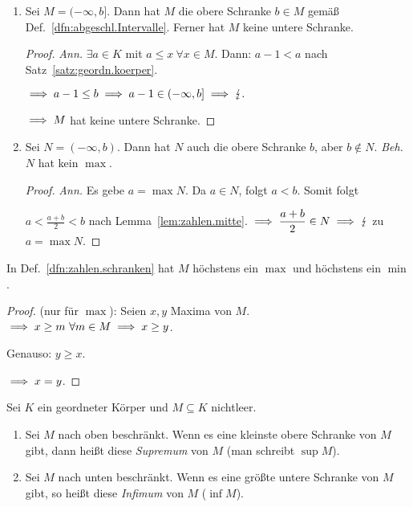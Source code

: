 \documentclass[12pt]{scrreprt}
\begin{document}
\begin{bsp}
\begin{enumerate} %
\item Sei $M=(-\infty,b]$. Dann hat $M$ die obere Schranke $b\in M$ gemäß Def.~\ref{dfn:abgeschl.Intervalle}. Ferner hat $M$ keine untere Schranke.
\begin{proof}\textit{Ann.} $\exists a\in K$ mit $a \leq x\ \forall x\in M$. Dann: $a-1<a$ nach Satz~\ref{satz:geordn.koerper}.

$\implies a-1\leq b \implies a-1\in (-\infty,b] \implies \lightning.$

$\implies M$ hat keine untere Schranke.\end{proof}

\item Sei $N=(-\infty,b)$. Dann hat $N$ auch die obere Schranke $b$, aber $b\notin N$. \textit{Beh.} $N$ hat kein $\max$.
\begin{proof}\textit{Ann.} Es gebe $a=\max N$. Da $a\in N$, folgt $a<b$. Somit folgt

$\displaystyle a<\frac{a+b}{2}<b$ nach Lemma~\ref{lem:zahlen.mitte}. $\displaystyle\implies\frac{a+b}{2}\in N\implies\lightning$ zu $a = \max N$.\end{proof}
\end{enumerate}
\end{bsp}

\begin{bem}\label{bem:zahlen.einmax}
In Def.~\ref{dfn:zahlen.schranken} hat $M$ höchstens ein $\max$ und höchstens ein $\min$.
\end{bem}

\begin{proof}(nur für $\max$): Seien $x,y$ Maxima von $M$. $\implies x\geq m\ \forall m\in M\implies x\geq y$. 

Genauso: $y \geq x$.

$\implies x=y$.
\end{proof}

\begin{dfn}\label{dfn:zahlen.supinf}
Sei $K$ ein geordneter Körper und $M\subseteq K$ nichtleer.
\begin{enumerate}%
\item Sei $M$ nach oben beschränkt. Wenn es eine kleinste obere Schranke von $M$ gibt, dann heißt diese \textit{Supremum} von $M$ (man schreibt $\sup M$).

\item Sei $M$ nach unten beschränkt. Wenn es eine größte untere Schranke von $M$ gibt, so heißt diese \textit{Infimum} von $M$ ($\inf M$).
\end{enumerate}
\end{dfn}
\end{document}

